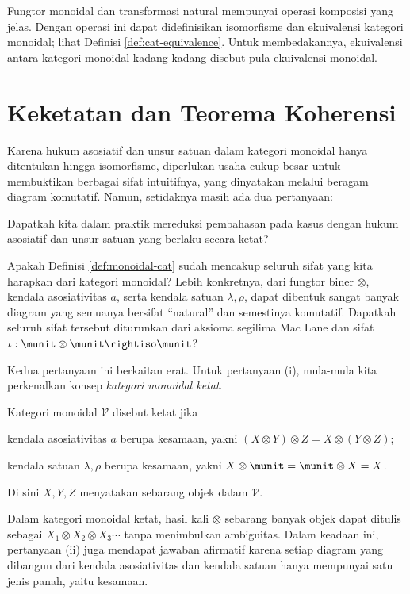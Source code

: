 Fungtor monoidal dan transformasi natural mempunyai operasi komposisi yang jelas. Dengan operasi ini dapat didefinisikan isomorfisme dan ekuivalensi kategori monoidal; lihat Definisi \ref{def:cat-equivalence}. Untuk membedakannya, ekuivalensi antara kategori monoidal kadang-kadang disebut pula ekuivalensi monoidal.
\section{Keketatan dan Teorema Koherensi}\label{sec:coherence}
Karena hukum asosiatif dan unsur satuan dalam kategori monoidal hanya ditentukan hingga isomorfisme, diperlukan usaha cukup besar untuk membuktikan berbagai sifat intuitifnya, yang dinyatakan melalui beragam diagram komutatif. Namun, setidaknya masih ada dua pertanyaan:
\begin{compactenum}[(i)]
	\item Dapatkah kita dalam praktik mereduksi pembahasan pada kasus dengan hukum asosiatif dan unsur satuan yang berlaku secara ketat?
	\item Apakah Definisi \ref{def:monoidal-cat} sudah mencakup seluruh sifat yang kita harapkan dari kategori monoidal? Lebih konkretnya, dari fungtor biner $\otimes$, kendala asosiativitas $a$, serta kendala satuan $\lambda, \rho$, dapat dibentuk sangat banyak diagram yang semuanya bersifat ``natural'' dan semestinya komutatif. Dapatkah seluruh sifat tersebut diturunkan dari aksioma segilima Mac Lane dan sifat $\iota: \munit \otimes \munit \rightiso \munit$?
\end{compactenum}
Kedua pertanyaan ini berkaitan erat. Untuk pertanyaan (i), mula-mula kita perkenalkan konsep \emph{kategori monoidal ketat}.

\begin{definition}\label{def:strict-monoidal-cat}
	Kategori monoidal $\mathcal{V}$ disebut ketat jika
	\begin{compactitem}
		\item kendala asosiativitas $a$ berupa kesamaan, yakni $(X \otimes Y) \otimes Z = X \otimes (Y \otimes Z)$;
		\item kendala satuan $\lambda, \rho$ berupa kesamaan, yakni $X \otimes \munit = \munit \otimes X = X$.
	\end{compactitem}
	Di sini $X,Y,Z$ menyatakan sebarang objek dalam $\mathcal{V}$.
\end{definition}
Dalam kategori monoidal ketat, hasil kali $\otimes$ sebarang banyak objek dapat ditulis sebagai $X_1 \otimes X_2 \otimes X_3 \cdots$ tanpa menimbulkan ambiguitas. Dalam keadaan ini, pertanyaan (ii) juga mendapat jawaban afirmatif karena setiap diagram yang dibangun dari kendala asosiativitas dan kendala satuan hanya mempunyai satu jenis panah, yaitu kesamaan.

